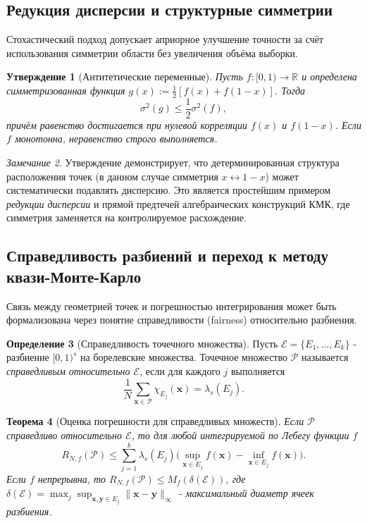 \documentclass[12pt, a4paper]{article}
\theoremstyle{plain}
\newtheorem{theorem}{Теорема}[section]
\newtheorem{proposition}[theorem]{Утверждение}
\theoremstyle{definition}
\newtheorem{definition}[theorem]{Определение}
\theoremstyle{remark}
\newtheorem{remark}[theorem]{Замечание}
\newcommand{\RR}{\mathbb{R}}
\newcommand{\II}{[0, 1)}
\newcommand{\PP}{\mathcal{P}}
\newcommand{\vx}{\boldsymbol{x}}
\newcommand{\vy}{\boldsymbol{y}}
\begin{document}
\subsection{Редукция дисперсии и структурные симметрии}
Стохастический подход допускает априорное улучшение точности за счёт использования симметрии области без увеличения объёма выборки.

\begin{proposition}[Антитетические переменные]
Пусть $f: \II \to \RR$ и определена симметризованная функция $g(x) := \frac{1}{2}[f(x) + f(1-x)]$. Тогда
\[
\sigma^2(g) \le \frac{1}{2} \sigma^2(f),
\]
причём равенство достигается при нулевой корреляции $f(x)$ и $f(1-x)$. Если $f$ монотонна, неравенство строго выполняется.
\end{proposition}

\begin{remark}
Утверждение демонстрирует, что детерминированная структура расположения точек (в данном случае симметрия $x \leftrightarrow 1-x$) может систематически подавлять дисперсию. Это является простейшим примером \textit{редукции дисперсии} и прямой предтечей алгебраических конструкций КМК, где симметрия заменяется на контролируемое расхождение.
\end{remark}

\subsection{Справедливость разбиений и переход к методу квази-Монте-Карло}
Связь между геометрией точек и погрешностью интегрирования может быть формализована через понятие справедливости (fairness) относительно разбиения.

\begin{definition}[Справедливость точечного множества]
Пусть $\mathcal{E} = \{E_1, \dots, E_k\}$ - разбиение $\II^s$ на борелевские множества. Точечное множество $\PP$ называется \textit{справедливым относительно $\mathcal{E}$}, если для каждого $j$ выполняется
\[
\frac{1}{N} \sum_{\vx \in \PP} \chi_{E_j}(\vx) = \lambda_s(E_j).
\]
\end{definition}

\begin{theorem}[Оценка погрешности для справедливых множеств]
Если $\PP$ справедливо относительно $\mathcal{E}$, то для любой интегрируемой по Лебегу функции $f$
\[
R_{N,f}(\PP) \le \sum_{j=1}^k \lambda_s(E_j) \bigl( \sup_{\vx \in E_j} f(\vx) - \inf_{\vx \in E_j} f(\vx) \bigr).
\]
Если $f$ непрерывна, то $R_{N,f}(\PP) \le M_f(\delta(\mathcal{E}))$, где $\delta(\mathcal{E}) = \max_j \sup_{\vx,\vy \in E_j} \|\vx-\vy\|_\infty$ - максимальный диаметр ячеек разбиения.
\end{theorem}
\end{document}

